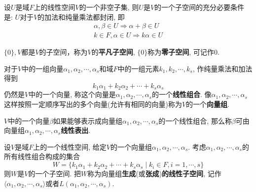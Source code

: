 \begin{Theorem}[!!!]
设$U$是域$F$上的线性空间$V$的一个非空子集, 则$U$是$V$的一个子空间的充分必要条件是: $U$对于$V$的加法和纯量乘法都封闭, 即
$$
\begin{aligned}
\alpha, \beta \in U \Rightarrow \alpha + \beta \in U \\
k \in F, \alpha \in U \Rightarrow k \alpha \in U
\end{aligned}
$$
\end{Theorem}

\begin{Note}
$\{ 0 \}, V$都是$V$的子空间，称为$V$的\textbf{平凡子空间}, $\{ 0 \}$称为\textbf{零子空间}, 可记作$\mathfrak{0}$.
\end{Note}

\begin{Definition}
对于$V$中的一组向量$\alpha_1, \alpha_2, \cdots, \alpha_s$和域$F$中的一组元素$k_1, k_2, \cdots, k_s$, 作纯量乘法和加法得到
$$
k_1 \alpha_1 + k_2 \alpha_2 + \cdots +k_s \alpha_s
$$
仍然是$V$中的一个向量, 称这个向量是$\alpha_1, \alpha_2, \cdots, \alpha_s$的一个\textbf{线性组合}.
像$\alpha_1, \alpha_2, \cdots, \alpha_s$这样按照一定顺序写出的\;\;多个向量(允许有相同的向量)称为$V$的一个\textbf{向量组}.
\end{Definition}

\begin{Definition}[线性表出]
$V$中的一个向量$\beta$如果能够表示成向量组$\alpha_1, \alpha_2, \cdots, \alpha_s$的一个线性组合, 那么称$\beta$可由向量组$\alpha_1, \alpha_2, \cdots, \alpha_s$\textbf{线性表出}.
\end{Definition}

\begin{Definition}[由向量组生成的线性子空间]
设$V$是域$F$上的一个线性空间, 给定$V$的一个向量组$\alpha_1, \alpha_2, \cdots, \alpha_s$. 考虑$\alpha_1, \alpha_2, \cdots, \alpha_s$的所有线性组合构成的集合
$$
W = \{ k_1 \alpha_1 + k_2 \alpha_2 + \cdots + k_s \alpha_s \mid k_i \in F, i = 1, \cdots, s\}
$$
则$W$是$V$的一个子空间. 把$W$称为向量组\textbf{生成}(或\textbf{张成})\textbf{的线性子空间},
记作$\langle \alpha_1, \alpha_2, \cdots, \alpha_s \rangle$或者$L(\alpha_1, \alpha_2, \cdots, \alpha_s)$.
\end{Definition}


